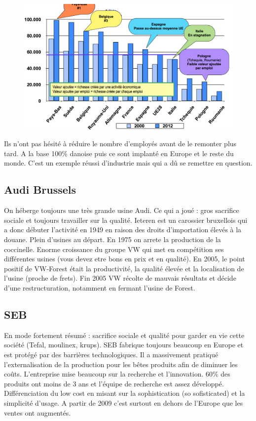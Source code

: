 \begin{figure}
\includegraphics[scale=0.29]{68}
\end{figure}
Ils n’ont pas hésité à réduire le nombre d'employés avant de le remonter plus tard. A la base 100\% danoise puis ce sont implanté en Europe et le reste du monde. C’est un exemple réussi d’industrie mais qui a dû se remettre en question. 

\subsection{Audi Brussels}
On héberge toujours une très grande usine Audi. Ce qui a joué : gros sacrifice sociale et toujours travailler sur la qualité. Ieteren est un carossier bruxellois qui a donc débuter l'activité en 1949 en raison des droits d'importation élevés à la douane. Plein d’usines au départ. En 1975 on arrete la production de la coccinelle. Enorme croissance du groupe VW qui met en compétition ses différentes usines (vous devez etre bons en prix et en qualité). En 2005, le point positif de VW-Forest était la productivité, la qualité élevée et la localisation de l'usine (proche de frets). Fin 2005 VW récolte de mauvais résultats et décide d'une restructuration, notamment en fermant l'usine de Forest.

\subsection{SEB}
En mode fortement résumé : sacrifice sociale et qualité pour garder en vie cette société (Tefal, moulinex, krups). SEB fabrique toujours beaucoup en Europe et est protégé par des barrières technologiques. Il a massivement pratiqué l’externalisation de la production pour les bêtes produits afin de diminuer les coûts. L'entreprise mise beaucoup sur la recherche et l'innovation. 60\% des produits ont moins de 3 ans et l'équipe de recherche est assez développé. Différenciation du low cost en misant sur la sophistication (so sofisticated) et la simplicité d'usage. A partir de 2009 c'est surtout en dehors de l'Europe que les ventes ont augmentés. 

